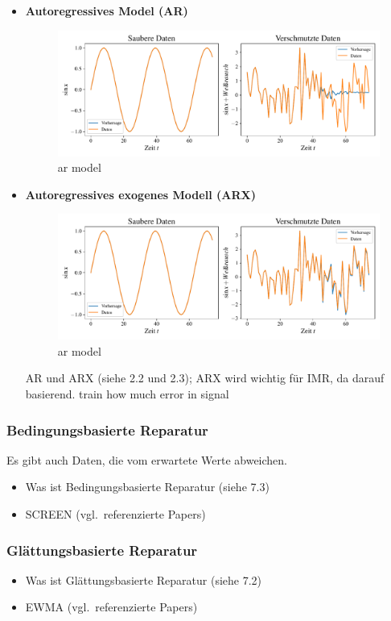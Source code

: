 \begin{itemize}
  \item \textbf{Autoregressives Model (AR)}\\
    \begin{figure}[h]
      \centering
      \includegraphics[width=\textwidth,keepaspectratio]{../plots/ar_sauber_verschmutze_daten.pdf}
      \caption{ar model}
    \end{figure}
  \item \textbf{Autoregressives exogenes Modell (ARX)}\\
    \begin{figure}[h]
      \centering
      \includegraphics[width=\textwidth,keepaspectratio]{../plots/arx_sauber_verschmutze_daten.pdf}
      \caption{ar model}
    \end{figure}
  AR und ARX (siehe 2.2 und 2.3); ARX wird wichtig für IMR, da darauf basierend.
  train how much error in signal
\end{itemize}
\subsubsection{Bedingungsbasierte Reparatur}
Es gibt auch Daten, die vom erwartete Werte abweichen. 
\begin{itemize}
  \item Was ist Bedingungsbasierte Reparatur (siehe 7.3)
  \item SCREEN (vgl.\ referenzierte Papers) 
\end{itemize}
\subsubsection{Glättungsbasierte Reparatur}
\begin{itemize}
  \item Was ist Glättungsbasierte Reparatur (siehe 7.2)
  \item EWMA (vgl.\ referenzierte Papers) 
\end{itemize}

